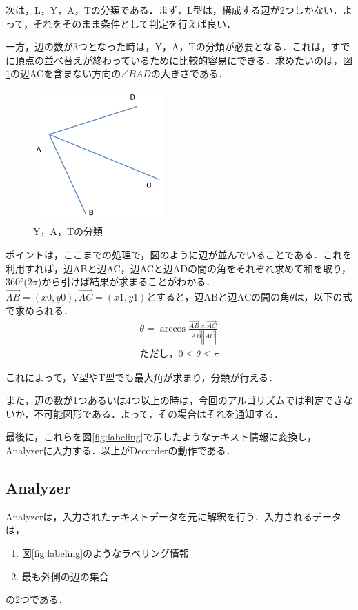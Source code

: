 \documentclass{jarticle}
\begin{document}
次は，L，Y，A，Tの分類である．まず，L型は，構成する辺が2つしかない．よって，それをそのまま条件として判定を行えば良い．

一方，辺の数が3つとなった時は，Y，A，Tの分類が必要となる．これは，すでに頂点の並べ替えが終わっているために比較的容易にできる．求めたいのは，図\ref{fig:classifying}の辺ACを含まない方向の$\angle{BAD}$の大きさである．

\begin{figure}[H]
\begin{center}
\includegraphics[width=50mm]{image/classifying.png}
\caption{Y，A，Tの分類}
\label{fig:classifying}
\end{center}
\end{figure}

ポイントは，ここまでの処理で，図のように辺が並んでいることである．これを利用すれば，辺ABと辺AC，辺ACと辺ADの間の角をそれぞれ求めて和を取り，360°($2 \pi$)から引けば結果が求まることがわかる．$\overrightarrow{AB} = (x0, y0), \overrightarrow{AC} = (x1, y1) $とすると，辺ABと辺ACの間の角$\theta$は，以下の式で求められる．
\begin{eqnarray}
	 \theta = \arccos {\frac{\overrightarrow{AB} \times \overrightarrow{AC}}{|\overrightarrow{AB}||\overrightarrow{AC}|}} \\
	 ただし，0 \le \theta \le \pi \nonumber
\end{eqnarray}

これによって，Y型やT型でも最大角が求まり，分類が行える．

また，辺の数が1つあるいは4つ以上の時は，今回のアルゴリズムでは判定できないか，不可能図形である．よって，その場合はそれを通知する．


最後に，これらを図\ref{fig:labeling}で示したようなテキスト情報に変換し，Analyzerに入力する．以上がDecorderの動作である．





\subsection{Analyzer}
Analyzerは，入力されたテキストデータを元に解釈を行う．入力されるデータは，
\begin{enumerate}
\item 図\ref{fig:labeling}のようなラベリング情報
\item 最も外側の辺の集合
\end{enumerate}
の2つである．
\end{document}

